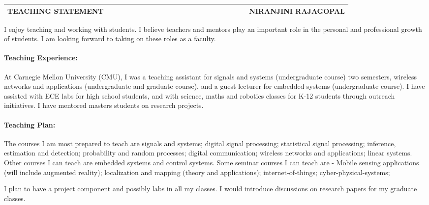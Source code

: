 \documentclass[10pt]{article}
\date{}
\begin{document}

\begin{table}
\color{blue}
\begin{tabular*}{\textwidth}{l r}
\large\textbf{TEACHING STATEMENT} & 
\hfill \ \ \ \ \ \ \ \ \ \ \ \ \ \ \ \ \ \ \ \
\ \ \ \ \ \ \ \ \ \ \ \ \ \ \ 
\large\textbf{NIRANJINI RAJAGOPAL}\\
\hline
\end{tabular*}

\end{table}


I enjoy teaching and working with students. I believe teachers and mentors play an important role in the personal and professional growth of students. I am looking forward to taking on these roles as a faculty.

\paragraph{Teaching Experience:}
At Carnegie Mellon University (CMU), I was a teaching assistant for signals and systems (undergraduate course) two semesters, wireless networks and applications (undergraduate and graduate course), and a guest lecturer for embedded systems (undergraduate course). I have assisted with ECE labs for high school students, and with science, maths and robotics classes for K-12 students through outreach initiatives. I have mentored masters students on research projects.  

\paragraph{Teaching Plan:}
The courses I am most prepared to teach are signals and systems;  digital signal processing; statistical signal processing; inference, estimation and detection; probability and random processes; digital communication; wireless networks and applications; linear systems. Other courses I can teach are embedded systems and control systems.
Some seminar courses I can teach are - Mobile sensing applications (will include augmented reality); localization and mapping (theory and applications); internet-of-things; cyber-physical-systems; %

I plan to have a project component  and possibly labs in all my classes. I would introduce discussions on research papers for my graduate classes.
\end{document}
